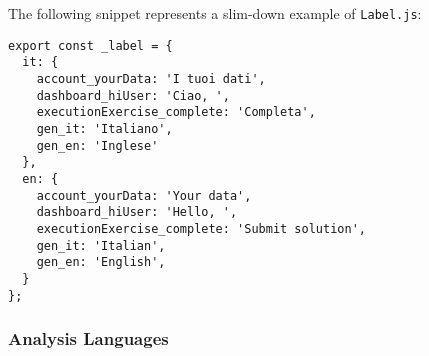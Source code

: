 The following snippet represents a slim-down example of \texttt{Label.js}:
\begin{lstlisting}
export const _label = {
  it: {
    account_yourData: 'I tuoi dati',
    dashboard_hiUser: 'Ciao, ',
    executionExercise_complete: 'Completa',
    gen_it: 'Italiano',
    gen_en: 'Inglese'
  },
  en: {
    account_yourData: 'Your data',
    dashboard_hiUser: 'Hello, ',
    executionExercise_complete: 'Submit solution',
    gen_it: 'Italian',
    gen_en: 'English',
  }
};
\end{lstlisting}


\subsubsection{Analysis Languages}




